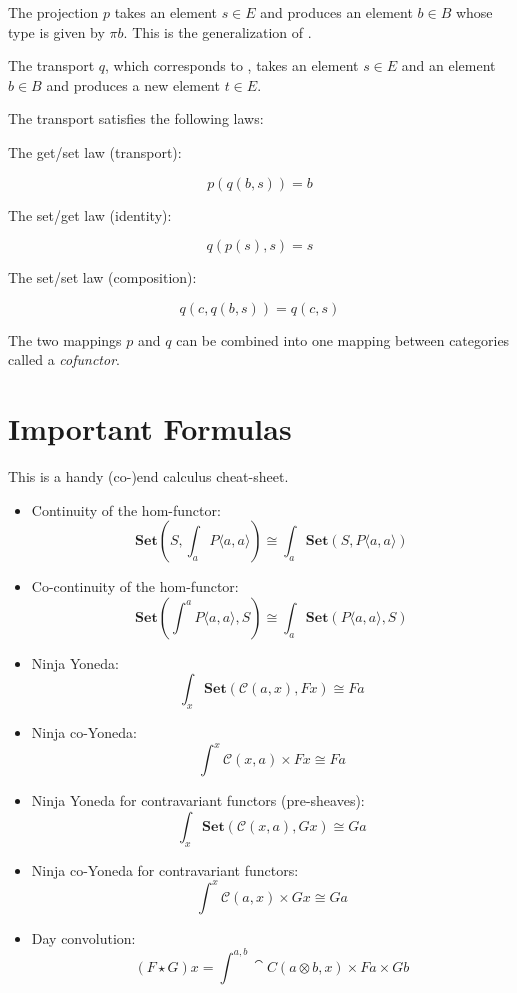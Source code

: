\documentclass[DaoFP]{subfiles}
\begin{document}
The projection $p$ takes an element $s \in E$ and produces an element $b \in B$ whose type is given by $\pi b$. This is the generalization of . 

The transport $q$, which corresponds to , takes an element $s \in E$ and an element $b \in B$ and produces a new element $t \in E$. 


The transport satisfies the following laws:

The get/set law (transport):

\[ p (q (b, s)) = b \]

The set/get law (identity):

\[ q ( p (s), s) = s \]

The set/set law (composition):

\[ q (c, q (b, s)) = q (c, s) \]

The two mappings $p$ and $q$ can be combined into one mapping between categories called a \emph{cofunctor}. 
\section{Important Formulas}
This is a handy (co-)end calculus cheat-sheet.
\begin{itemize}
\item Continuity of the hom-functor:
\[ \mathbf{Set}\left(S, \int_a P\langle a, a \rangle \right) \cong \int_a  \mathbf{Set}(S, P\langle a, a \rangle) \]
\item Co-continuity of the hom-functor:
\[ \mathbf{Set}\left( \int^a P\langle a, a \rangle , S\right) \cong \int_a  \mathbf{Set}(P\langle a, a \rangle, S) \]
\item Ninja Yoneda:
\[ \int_{x} \mathbf{Set} (\mathcal{C}(a, x), F x) \cong F a \]
\item Ninja co-Yoneda:
\[ \int^{x} \mathcal{C}(x, a) \times F x \cong F a \]
\item Ninja Yoneda for contravariant functors (pre-sheaves):
\[ \int_{x} \mathbf{Set} (\mathcal{C}(x, a), G x) \cong G a \]
\item Ninja co-Yoneda for contravariant functors:
\[ \int^{x} \mathcal{C}(a, x) \times G x \cong G a \]
\item Day convolution:
\[ (F \star G) x = \int^{a, b} \cat C (a \otimes b, x) \times F a \times G b \]

\end{itemize}
\end{document}
